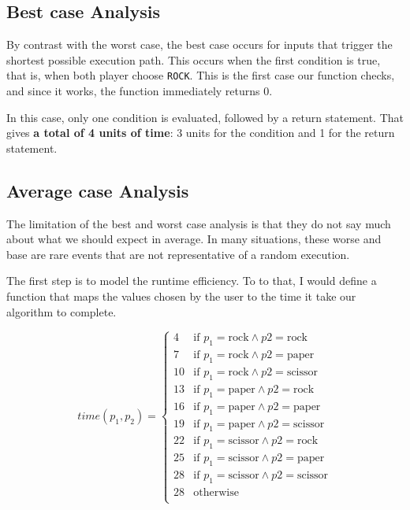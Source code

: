 \documentclass[11pt]{article}
\begin{document}
\subsection{Best case Analysis}
\label{sec:orgdee2328}

By contrast with the worst case, the best case occurs for inputs that
trigger the shortest possible execution path. This occurs when the
first condition is true, that is, when both player choose \texttt{ROCK}. This
is the first case our function checks, and since it works, the
function immediately returns 0.

In this case, only one condition is evaluated, followed by a return
statement. That gives \textbf{a total of 4 units of time}: 3 units for the
condition and 1 for the return statement.

\subsection{Average case Analysis}
\label{sec:org2133369}

The limitation of the best and worst case analysis is that they do not
say much about what we should expect in average. In many situations,
these worse and base are rare events that are not representative of
a random execution.

The first step is to model the runtime efficiency. To to that, I would
define a function that maps the values chosen by the user to the time
it take our algorithm to complete.

\[
time(p_1, p_2) = \begin{cases}
4 & \text{if } p_1 = \text{rock} \land p2 = \text{rock} \\
7 & \text{if } p_1 = \text{rock} \land p2 = \text{paper} \\
10 & \text{if } p_1 = \text{rock} \land p2 = \text{scissor} \\
13 & \text{if } p_1 = \text{paper} \land p2 = \text{rock} \\
16 & \text{if } p_1 = \text{paper} \land p2 = \text{paper} \\
19 & \text{if } p_1 = \text{paper} \land p2 = \text{scissor} \\
22 & \text{if } p_1 = \text{scissor} \land p2 = \text{rock} \\
25 & \text{if } p_1 = \text{scissor} \land p2 = \text{paper} \\
28 & \text{if } p_1 = \text{scissor} \land p2 = \text{scissor} \\
28 & \text{otherwise} \\
\end{cases}
\]
\end{document}
